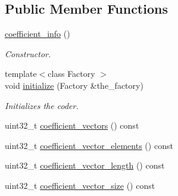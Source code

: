\subsection*{Public Member Functions}
\begin{DoxyCompactItemize}
\item 
\hypertarget{classkodo_1_1coefficient__info_aebcd7f57c492a854646c83631ee6a86c}{\hyperlink{classkodo_1_1coefficient__info_aebcd7f57c492a854646c83631ee6a86c}{coefficient\-\_\-info} ()}\label{classkodo_1_1coefficient__info_aebcd7f57c492a854646c83631ee6a86c}

\begin{DoxyCompactList}\small\item\em Constructor. \end{DoxyCompactList}\item 
{\footnotesize template$<$class Factory $>$ }\\void \hyperlink{classkodo_1_1coefficient__info_a5645a41990fe69c783e326b58c0530bf}{initialize} (Factory \&the\-\_\-factory)
\begin{DoxyCompactList}\small\item\em Initializes the coder. \end{DoxyCompactList}\item 
uint32\-\_\-t \hyperlink{classkodo_1_1coefficient__info_af1d7e9b534262aab49f7c15aacb09981}{coefficient\-\_\-vectors} () const 
\begin{DoxyCompactList}\small\item\em \end{DoxyCompactList}\item 
uint32\-\_\-t \hyperlink{classkodo_1_1coefficient__info_a48d8d488f4a4327bf43b1693e3bd2d54}{coefficient\-\_\-vector\-\_\-elements} () const 
\begin{DoxyCompactList}\small\item\em \end{DoxyCompactList}\item 
uint32\-\_\-t \hyperlink{classkodo_1_1coefficient__info_af8946b34b40c1036ec6da6cefee60f67}{coefficient\-\_\-vector\-\_\-length} () const 
\begin{DoxyCompactList}\small\item\em \end{DoxyCompactList}\item 
uint32\-\_\-t \hyperlink{classkodo_1_1coefficient__info_af176b13de27ed152a0745c64dbf3e732}{coefficient\-\_\-vector\-\_\-size} () const 
\begin{DoxyCompactList}\small\item\em \end{DoxyCompactList}\end{DoxyCompactItemize}


